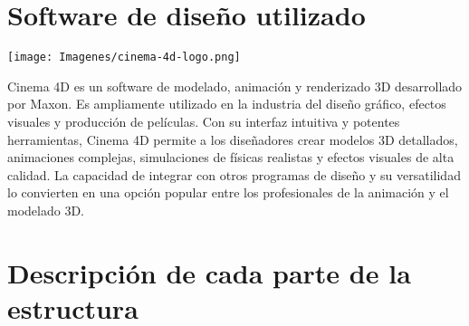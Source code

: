 \section{Software de diseño utilizado}
    \noindent  %
        \begin{center}
            \texttt{[image: Imagenes/cinema-4d-logo.png]}
            \label{fig:logo_cinema}
        \end{center}
    
    \noindent Cinema 4D es un software de modelado, animación y renderizado 3D desarrollado por Maxon. Es ampliamente utilizado en la industria del diseño gráfico, efectos visuales y producción de películas. Con su interfaz intuitiva y potentes herramientas, Cinema 4D permite a los diseñadores crear modelos 3D detallados, animaciones complejas, simulaciones de físicas realistas y efectos visuales de alta calidad. La capacidad de integrar con otros programas de diseño y su versatilidad lo convierten en una opción popular entre los profesionales de la animación y el modelado 3D.

\section{Descripción de cada parte de la estructura}


